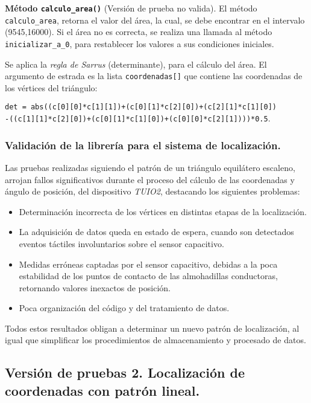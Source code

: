 \textbf{Método \texttt{calculo\_area()}} (Versión de prueba no valida).
El método \texttt{calculo\_area}, retorna el valor del área, la cual, se debe encontrar en el intervalo (9545,16000). 
Si el área no es correcta, se realiza una llamada al método \texttt{inicializar\_a\_0}, para restablecer los valores a sus condiciones iniciales. 

Se aplica la \emph{regla de Sarrus} (determinante), para el cálculo del área. El argumento de estrada es la lista \texttt{coordenadas[]} que contiene las coordenadas de los vértices del triángulo:

\texttt{det = abs((c[0][0]*c[1][1])+(c[0][1]*c[2][0])+(c[2][1]*c[1][0])}\\
\texttt{-((c[1][1]*c[2][0])+(c[0][1]*c[1][0])+(c[0][0]*c[2][1])))*0.5}.\\



\subsubsection{Validación de la librería para el sistema de localización.}

Las pruebas realizadas siguiendo el patrón de un triángulo equilátero escaleno, arrojan fallos significativos durante el proceso del cálculo de las coordenadas y ángulo de posición, del dispositivo \emph{TUIO2}, destacando los siguientes problemas:
\begin{itemize}
\item Determinación incorrecta de los vértices en distintas etapas de la localización.
\item La adquisición de datos queda en estado de espera, cuando son detectados eventos táctiles involuntarios sobre el sensor capacitivo.
\item Medidas erróneas captadas por el sensor capacitivo, debidas a la poca estabilidad de los puntos de contacto de las almohadillas conductoras, retornando valores inexactos de posición.
\item Poca organización del código y del tratamiento de datos.
\end{itemize}

Todos estos resultados obligan a determinar un nuevo patrón de localización, al igual que simplificar los procedimientos de almacenamiento y procesado de datos.
 
\subsection{Versión de pruebas 2. Localización de coordenadas con patrón lineal.}

